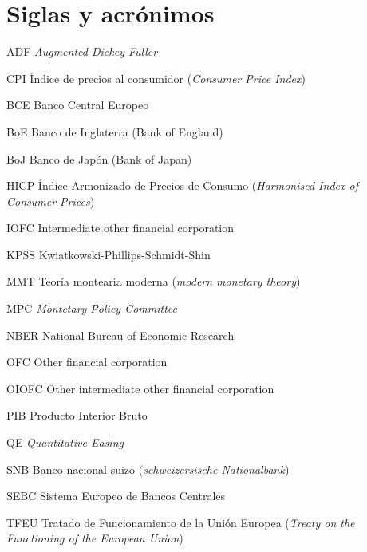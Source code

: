 \section*{Siglas y acrónimos}

ADF \textit{Augmented Dickey-Fuller}

CPI	Índice de precios al consumidor (\textit{Consumer Price Index})

BCE	Banco Central Europeo

BoE	Banco de Inglaterra (Bank of England)

BoJ	Banco de Japón (Bank of Japan)

HICP	Índice Armonizado de Precios de Consumo (\textit{Harmonised Index of Consumer Prices})

IOFC	Intermediate other financial corporation

KPSS Kwiatkowski-Phillips-Schmidt-Shin

MMT	Teoría montearia moderna (\textit{modern monetary theory})

MPC \textit{Montetary Policy Committee}

NBER	National Bureau of Economic Research

OFC 	Other financial corporation

OIOFC	Other intermediate other financial corporation

PIB	Producto Interior Bruto

QE \textit{Quantitative Easing}

SNB	Banco nacional suizo (\textit{schweizersische Nationalbank})

SEBC	Sistema Europeo de Bancos Centrales

TFEU	Tratado de Funcionamiento de la Unión Europea (\textit{Treaty on the Functioning of the European Union})